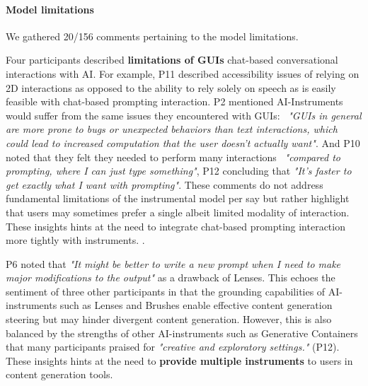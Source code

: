 \paragraph{\textbf{Model limitations}} 

We gathered 20/156 comments pertaining to the model limitations.

Four participants described \textbf{limitations of GUIs}  chat-based conversational interactions with AI. For example, P11 described accessibility issues of relying on 2D interactions as opposed to the ability to rely solely on speech as is easily feasible with chat-based prompting interaction. P2 mentioned AI-Instruments would suffer from the same issues they encountered with GUIs: ~\textit{"GUIs in general are more prone to bugs or unexpected behaviors than text interactions, which could lead to increased computation that the user doesn't actually want"}. And P10 noted that they felt they needed to perform many interactions ~\textit{"compared to prompting, where I can just type something"}, P12 concluding that \textit{"It's faster to get exactly what I want with prompting"}. These comments do not address fundamental limitations of the instrumental model per say but rather highlight that users may sometimes prefer a single albeit limited modality of interaction. These insights hints at the need to integrate chat-based prompting interaction more tightly with instruments. .

P6 noted that \textit{"It might be better to write a new prompt when I need to make major modifications to the output"} as a drawback of Lenses. This echoes the sentiment of three other participants in that the grounding capabilities of AI-instruments such as Lenses and Brushes enable effective content generation steering but may hinder divergent content generation. However, this is also balanced by the strengths of other AI-instruments such as Generative Containers that many participants praised for \textit{"creative and exploratory settings."} (P12). These insights hints at the need to \textbf{provide multiple instruments} to users in content generation tools. 

